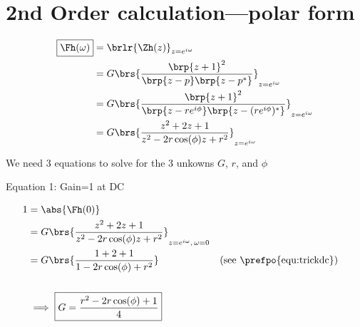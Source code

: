 \section{2nd Order  calculation---polar form}
\begin{align*}
  \boxed{\Fh(\omega)}
    &= \brlr{\Zh(z)}_{z=e^{i\omega}}
  \\&= G\brs{\frac{\brp{z+1}^2}
                  {\brp{z-p}\brp{z-p^\ast}}}_{z=e^{i\omega}}
  \\&= G\brs{\frac{\brp{z+1}^2}
                  {\brp{z-re^{i\phi}}\brp{z-(re^{i\phi})^\ast}}}_{z=e^{i\omega}}
  \\&= G\brs{\frac{z^2 + 2z + 1}
                  {z^2 - 2r\cos(\phi)z + r^2}
            }_{z=e^{i\omega}}
\end{align*}

We need 3 equations to solve for the 3 unkowns $G$, $r$, and $\phi$


Equation 1: Gain=1 at DC

\begin{align*}
  1 &= \abs{\Fh(0)}
  \\&= G\brs{\frac{z^2 + 2z            + 1}
                  {z^2 - 2r\cos(\phi)z + r^2}}_{z=e^{i\omega},\,\omega=0}
  \\&= G\brs{\frac{1   + 2             + 1}
                  {1   - 2r\cos(\phi)  + r^2}}
    && \text{(see \prefpo{equ:trickdc})}
  \\
  \\&\implies \boxed{G = \frac{r^2 - 2r\cos(\phi) + 1}{4}}
\end{align*}




